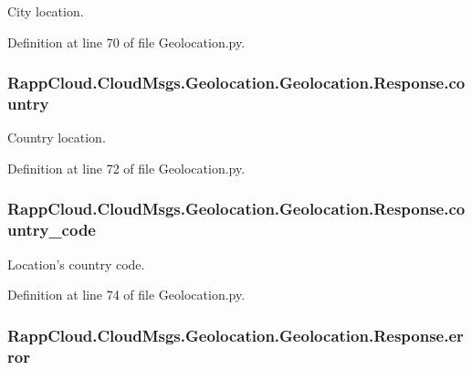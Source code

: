 City location. 



Definition at line 70 of file Geolocation.\-py.

\hypertarget{classRappCloud_1_1CloudMsgs_1_1Geolocation_1_1Geolocation_1_1Response_af43fdc30cd729653646d67f31d31c8cf}{
\subsubsection[{country}]{\setlength{\rightskip}{0pt plus 5cm}Rapp\-Cloud.\-Cloud\-Msgs.\-Geolocation.\-Geolocation.\-Response.\-country}}\label{classRappCloud_1_1CloudMsgs_1_1Geolocation_1_1Geolocation_1_1Response_af43fdc30cd729653646d67f31d31c8cf}


Country location. 



Definition at line 72 of file Geolocation.\-py.

\hypertarget{classRappCloud_1_1CloudMsgs_1_1Geolocation_1_1Geolocation_1_1Response_afb645e20f09cf80349d7f0c2b82d8a7d}{
\subsubsection[{country\-\_\-code}]{\setlength{\rightskip}{0pt plus 5cm}Rapp\-Cloud.\-Cloud\-Msgs.\-Geolocation.\-Geolocation.\-Response.\-country\-\_\-code}}\label{classRappCloud_1_1CloudMsgs_1_1Geolocation_1_1Geolocation_1_1Response_afb645e20f09cf80349d7f0c2b82d8a7d}


Location's country code. 



Definition at line 74 of file Geolocation.\-py.

\hypertarget{classRappCloud_1_1CloudMsgs_1_1Geolocation_1_1Geolocation_1_1Response_a98cf8817ae5b56c428daf4512721a897}{
\subsubsection[{error}]{\setlength{\rightskip}{0pt plus 5cm}Rapp\-Cloud.\-Cloud\-Msgs.\-Geolocation.\-Geolocation.\-Response.\-error}}\label{classRappCloud_1_1CloudMsgs_1_1Geolocation_1_1Geolocation_1_1Response_a98cf8817ae5b56c428daf4512721a897}


